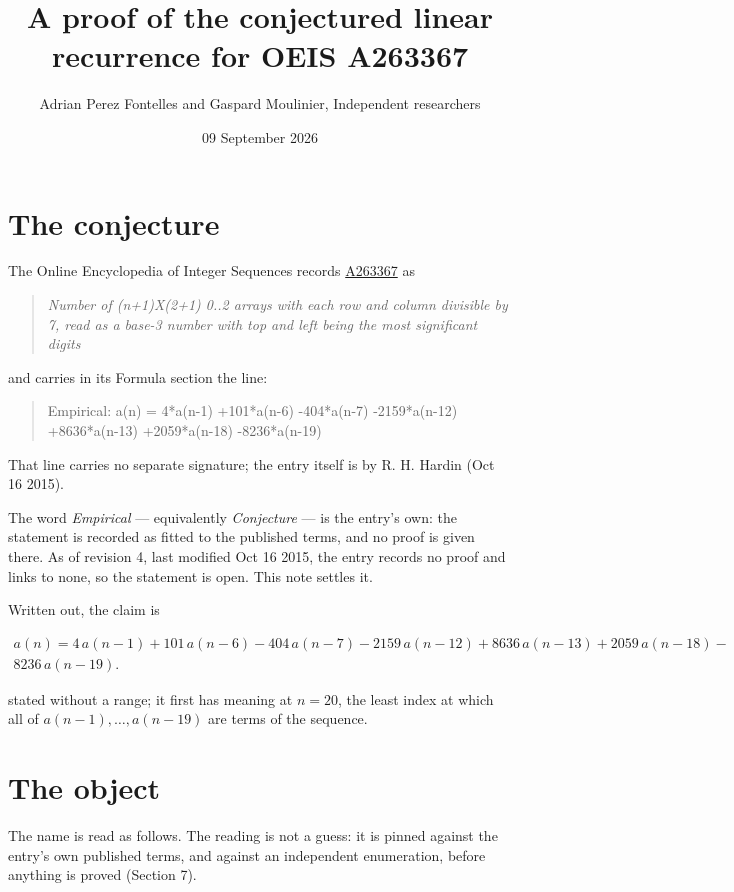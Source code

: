 \documentclass[11pt]{article}
\title{A proof of the conjectured linear recurrence for OEIS A263367}
\author{Adrian Perez Fontelles and Gaspard Moulinier, Independent researchers}
\date{09 September 2026}
\theoremstyle{definition}
\begin{document}
\maketitle
\section{The conjecture}

The Online Encyclopedia of Integer Sequences records \href{https://oeis.org/A263367}{A263367} as

\begin{quote}\itshape Number of (n+1)X(2+1) 0..2 arrays with each row and column divisible by 7, read as a base-3 number with top and left being the most significant digits\end{quote}

and carries in its Formula section the line:

\begin{quote}\ttfamily Empirical: a(n) = 4*a(n-1) +101*a(n-6) -404*a(n-7) -2159*a(n-12) +8636*a(n-13) +2059*a(n-18) -8236*a(n-19)\end{quote}

That line carries no separate signature; the entry itself is by R. H. Hardin (Oct 16 2015).

The word {\itshape Empirical} --- equivalently {\itshape Conjecture} --- is the entry's own: the statement is recorded as fitted to the published terms, and no proof is given there. As of revision 4, last modified Oct 16 2015, the entry records no proof and links to none, so the statement is open. This note settles it.

Written out, the claim is

\begin{multline*} a(n) = 4\,a(n-1) + 101\,a(n-6) - 404\,a(n-7) - 2159\,a(n-12) + 8636\,a(n-13) + 2059\,a(n-18) - \\ 8236\,a(n-19). \end{multline*}

stated without a range; it first has meaning at $n = 20$, the least index at which all of $a(n-1),\dots,a(n-19)$ are terms of the sequence.

\section{The object}

The name is read as follows. The reading is not a guess: it is pinned against the entry's own published terms, and against an independent enumeration, before anything is proved (Section 7).
\end{document}
